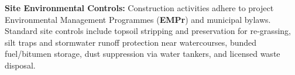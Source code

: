 \documentclass[a4paper,11pt]{article}
\begin{document}
\hfill
\begin{minipage}[t]{0.32\textwidth}
    \begin{tcolorbox}[
        enhanced, colback=white, colframe=mhlightgray, boxrule=0.8pt, arc=4pt,
        title={\bfseries\color{white}\faLeaf\ Environmental Care},
        colbacktitle=mhbluebright, fonttitle=\bfseries\footnotesize,
        left=7pt, right=7pt, top=7pt, bottom=7pt, height=6.4cm,
        drop shadow=black!4
    ]
        {\fontsize{8.1pt}{11.3pt}\selectfont\color{mhtext}
        \textbf{Site Environmental Controls:} Construction activities adhere to project Environmental Management Programmes (\textbf{EMPr}) and municipal bylaws.\\[4pt]
        Standard site controls include topsoil stripping and preservation for re-grassing, silt traps and stormwater runoff protection near watercourses, bunded fuel/bitumen storage, dust suppression via water tankers, and licensed waste disposal.
        }
    \end{tcolorbox}
\end{minipage}

\vfill
\end{document}
